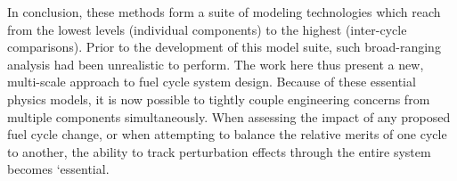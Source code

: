 In conclusion, these methods form a suite of modeling technologies which reach from the lowest levels
(individual components) to the highest (inter-cycle comparisons).
Prior to the development of this model suite, such broad-ranging analysis had been unrealistic to perform.
The work here thus present a new, multi-scale approach to fuel cycle system design.  
Because of these essential physics models, it is now possible to tightly couple engineering 
concerns from multiple components simultaneously.  When assessing the impact of any 
proposed fuel cycle change, or when attempting to balance the relative merits of one 
cycle to another, the ability to track perturbation effects through the entire system becomes
`essential.
